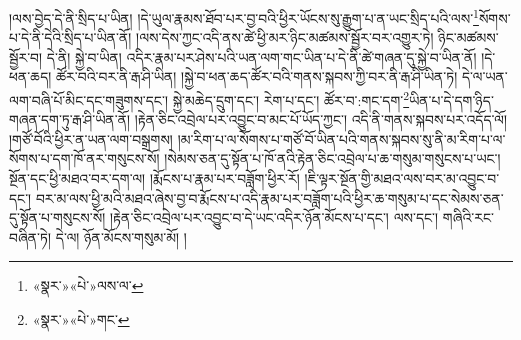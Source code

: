 །ལས་བྱེད་དེ་ནི་སྲིད་པ་ཡིན། །དེ་ཡུལ་རྣམས་ཐོབ་པར་བྱ་བའི་ཕྱིར་ཡོངས་སུ་རྒྱུག་པ་ན་ཡང་སྲིད་པའི་ལས་\footnote{«སྣར་»«པེ་»ལས་ལ་}སོགས་པ་དེ་ནི་དེའི་སྲིད་པ་ཡིན་ནོ། །ལས་དེས་ཀྱང་འདི་ནས་ཚེ་ཕྱི་མར་ཉིང་མཚམས་སྦྱོར་བར་འགྱུར་ཏེ། ཉིང་མཚམས་སྦྱོར་བ། དེ་ནི། སྐྱེ་བ་ཡིན། འདིར་རྣམ་པར་ཤེས་པའི་ཡན་ལག་གང་ཡིན་པ་དེ་ནི་ཚེ་གཞན་དུ་སྐྱེ་བ་ཡིན་ནོ། །དེ་ཕན་ཆད། ཚོར་བའི་བར་ནི་རྒ་ཤི་ཡིན། །སྐྱེ་བ་ཕན་ཆད་ཚོར་བའི་གནས་སྐབས་ཀྱི་བར་ནི་རྒ་ཤི་ཡིན་ཏེ། དེ་ལ་ཡན་ལག་བཞི་པོ་མིང་དང་གཟུགས་དང་། སྐྱེ་མཆེད་དྲུག་དང་། རེག་པ་དང་། ཚོར་བ་:གང་དག་\footnote{«སྣར་»«པེ་»གང་}ཡིན་པ་དེ་དག་ཉིད་གཞན་དག་ཏུ་རྒ་ཤི་ཡིན་ནོ། །རྟེན་ཅིང་འབྲེལ་པར་འབྱུང་བ་མང་པོ་ཡོད་ཀྱང་། འདི་ནི་གནས་སྐབས་པར་འདོད་ལོ། །གཙོ་བོའི་ཕྱིར་ན་ཡན་ལག་བསྒྲགས། །མ་རིག་པ་ལ་སོགས་པ་གཙོ་བོ་ཡིན་པའི་གནས་སྐབས་སུ་ནི་མ་རིག་པ་ལ་སོགས་པ་དག་ཁོ་ནར་གསུངས་སོ། །སེམས་ཅན་དུ་སྟོན་པ་ཁོ་ནའི་རྟེན་ཅིང་འབྲེལ་པ་ཆ་གསུམ་གསུངས་པ་ཡང་། སྔོན་དང་ཕྱི་མཐའ་བར་དག་ལ། །རྨོངས་པ་རྣམ་པར་བཟློག་ཕྱིར་རོ། །ཇི་ལྟར་སྔོན་གྱི་མཐའ་ལས་བར་མ་འབྱུང་བ་དང་། བར་མ་ལས་ཕྱི་མའི་མཐའ་ཞེས་བྱ་བ་རྨོངས་པ་འདི་རྣམ་པར་བཟློག་པའི་ཕྱིར་ཆ་གསུམ་པ་དང་སེམས་ཅན་དུ་སྟོན་པ་གསུངས་སོ། །རྟེན་ཅིང་འབྲེལ་པར་འབྱུང་བ་དེ་ཡང་འདིར་ཉོན་མོངས་པ་དང་། ལས་དང་། གཞིའི་རང་བཞིན་ཏེ། དེ་ལ། ཉོན་མོངས་གསུམ་མོ། །

